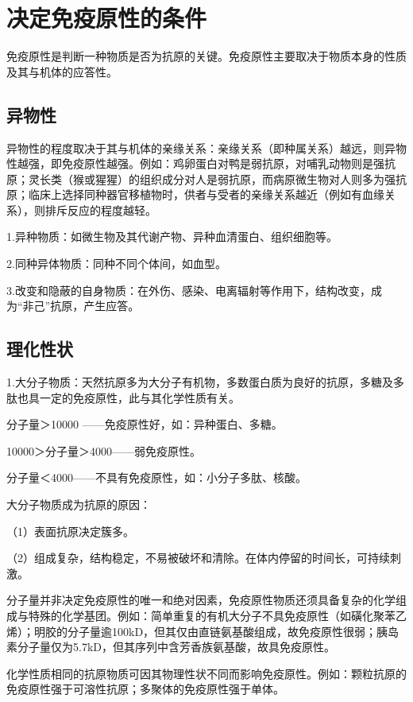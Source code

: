 \section{决定免疫原性的条件}

免疫原性是判断一种物质是否为抗原的关键。免疫原性主要取决于物质本身的性质及其与机体的应答性。


\subsection{异物性}

异物性的程度取决于其与机体的亲缘关系：亲缘关系（即种属关系）越远，则异物性越强，即免疫原性越强。例如：鸡卵蛋白对鸭是弱抗原，对哺乳动物则是强抗原；灵长类（猴或猩猩）的组织成分对人是弱抗原，而病原微生物对人则多为强抗原；临床上选择同种器官移植物时，供者与受者的亲缘关系越近（例如有血缘关系），则排斥反应的程度越轻。

1.异种物质：如微生物及其代谢产物、异种血清蛋白、组织细胞等。

2.同种异体物质：同种不同个体间，如血型。

3.改变和隐蔽的自身物质：在外伤、感染、电离辐射等作用下，结构改变，成为“非己”抗原，产生应答。


\subsection{理化性状}

1.大分子物质：天然抗原多为大分子有机物，多数蛋白质为良好的抗原，多糖及多肽也具一定的免疫原性，此与其化学性质有关。

分子量＞10000 ------免疫原性好，如：异种蛋白、多糖。

10000＞分子量＞4000------弱免疫原性。

分子量＜4000------不具有免疫原性，如：小分子多肽、核酸。

大分子物质成为抗原的原因：

（1）表面抗原决定簇多。

（2）组成复杂，结构稳定，不易被破坏和清除。在体内停留的时间长，可持续刺激。

分子量并非决定免疫原性的唯一和绝对因素，免疫原性物质还须具备复杂的化学组成与特殊的化学基团。例如：简单重复的有机大分子不具免疫原性（如磺化聚苯乙烯）；明胶的分子量逾100kD，但其仅由直链氨基酸组成，故免疫原性很弱；胰岛素分子量仅为5.7kD，但其序列中含芳香族氨基酸，故具免疫原性。

化学性质相同的抗原物质可因其物理性状不同而影响免疫原性。例如：颗粒抗原的免疫原性强于可溶性抗原；多聚体的免疫原性强于单体。


